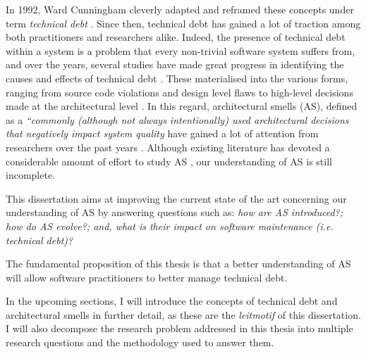 In 1992, Ward Cunningham cleverly adapted and reframed these concepts under term \emph{technical debt} \cite{Cunningham1992}. %
Since then, technical debt has gained a lot of traction among both practitioners and researchers alike.
Indeed, the presence of technical debt within a system is a problem that every non-trivial software system suffers from, and over the years, several studies have made great progress in identifying the causes and effects of technical debt \cite{Brown2010,Kruchten2012,Lehman1979}.
These materialised into the various forms, ranging from source code violations \cite{Letouzey2012,Curtis2012} and design level flaws \cite{Marinescu2012} to high-level decisions made at the architectural level \cite{Ernst2015,Yli-Huumo2014}.
In this regard, architectural smells (AS), defined as a \emph{``commonly (although not always intentionally) used architectural decisions that negatively impact system quality} \cite{Garcia2009} have gained a lot of attention from researchers over the past years \cite{Verdecchia2018}.
Although existing literature has devoted a considerable amount of effort to study AS \cite{Mo2015,Le2016,Arcelli2016}, our understanding of AS is still incomplete.

This dissertation aims at improving the current state of the art concerning our understanding of AS by answering questions such as: \emph{how are AS introduced?; how do AS evolve?; and, what is their impact on software maintenance (i.e. technical debt)?}

The fundamental proposition of this thesis is that a better understanding of AS will allow software practitioners to better manage technical debt.

In the upcoming sections, I will introduce the concepts of technical debt and architectural smells in further detail, as these are the \emph{leitmotif} of this dissertation.
I will also decompose the research problem addressed in this thesis into multiple research questions and the methodology used to answer them.


